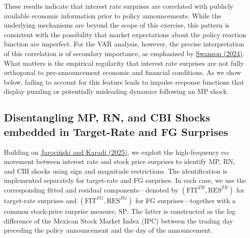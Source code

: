 \documentclass[\latexroot/\projectname]{subfiles}
\begin{document}


These results indicate that interest rate surprises are correlated with publicly available economic information prior to policy announcements. While the underlying mechanisms are beyond the scope of this exercise, this pattern is consistent with the possibility that market expectations about the policy reaction function are imperfect. For the VAR analysis, however, the precise interpretation of this correlation is of secondary importance, as emphasized by \hyperlink{Swanson (2024)}{Swanson (2024)}. What matters is the empirical regularity that interest rate surprises are not fully orthogonal to pre-announcement economic and financial conditions. As we show below, failing to account for this feature leads to impulse response functions that display puzzling or potentially misleading dynamics following an MP shock.

\subsection{Disentangling MP, RN, and CBI Shocks embedded in Target-Rate and FG Surprises}

Building on \hyperlink{Jarociński and Karadi (2025)}{Jarociński and Karadi (2025)}, we exploit the high-frequency co-movement between interest rate and stock price surprises to identify MP, RN, and CBI shocks using sign and magnitude restrictions. The identification is implemented separately for target-rate and FG surprises. In each case, we use the corresponding fitted and residual components—denoted by $(\text{FIT}^{TR}, \text{RES}^{TR})$ for target-rate surprises and $(\text{FIT}^{FG}, \text{RES}^{FG})$ for FG surprises—together with a common stock-price surprise measure, $\text{SP}$. The latter is constructed as the log difference of the Mexican Stock Market Index (IPC) between the trading day preceding the policy announcement and the day of the announcement.
\end{document}
